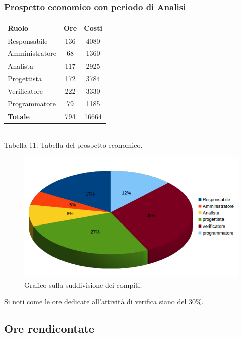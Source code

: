 \subsubsection{Prospetto economico con periodo di Analisi}
\begin{center}
\begin{tabular}{| l | c | c |}
\hline
Ruolo & Ore & Costi \\
\hline
Responsabile & 136 & 4080 \\
Amministratore & 68 & 1360 \\
Analista & 117 & 2925\\
Progettista & 172 & 3784 \\
Verificatore & 222 & 3330 \\
Programmatore & 79 & 1185 \\
\hline
\textbf{Totale} & 794 & 16664 \\
\hline
\end{tabular}
\\
Tabella 11: Tabella del prospetto economico.
\end{center}
\begin{figure}[H] \centering \includegraphics[width=%
\textwidth]
{../modello/img/torta5.png} \caption{ Grafico sulla suddivisione dei compiti.}
\end{figure}
Si noti come le ore dedicate all'attività di verifica siano del 30\%.\\
\subsection{Ore rendicontate}
